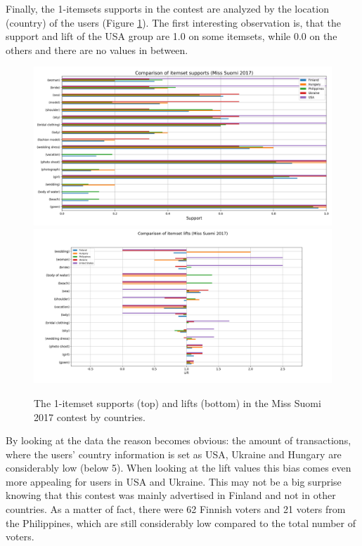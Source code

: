 Finally, the 1-itemsets supports in the contest are analyzed by the location (country) of the users (Figure \ref{itemset_supports-country-Miss_Helsinki-1_itemset}). The first interesting observation is, that the support and lift of the USA group are 1.0 on some itemsets, while 0.0 on the others and there are no values in between. 

\begin{figure}[] 
    \begin{center}
        \includegraphics[width=1.0\textwidth]{Images/itemset_supports-country-Miss_Helsinki-1_itemset.png}
        \includegraphics[width=1.0\textwidth]{Images/itemset_lifts-country-Miss_Suomi-1_itemsets.png}
        \caption{The 1-itemset supports (top) and lifts (bottom) in the Miss Suomi 2017 contest by countries.}
        \label{itemset_supports-country-Miss_Helsinki-1_itemset}
    \end{center}
\end{figure}

By looking at the data the reason becomes obvious: the amount of transactions, where the users' country information is set as USA, Ukraine and Hungary are considerably low (below 5). When looking at the lift values this bias comes even more appealing for users in USA and Ukraine. This may not be a big surprise knowing that this contest was mainly advertised in Finland and not in other countries. As a matter of fact, there were 62 Finnish voters and 21 voters from the Philippines, which are still considerably low compared to the total number of voters. 

